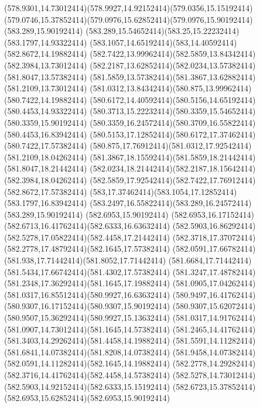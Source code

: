 {{	\curveto(578.9301,14.73012414)(578.9927,14.92152414)(579.0356,15.15192414)
	\curveto(579.0746,15.37852414)(579.0976,15.62852414)(579.0976,15.90192414)
	\closepath
	\moveto(583.289,15.90192414)
	\curveto(583.289,15.54652414)(583.25,15.22232414)(583.1797,14.93322414)
	\curveto(583.1057,14.65192414)(583,14.40592414)(582.8672,14.19882414)
	\curveto(582.7422,13.99962414)(582.5859,13.84342414)(582.3984,13.73012414)
	\curveto(582.2187,13.62852414)(582.0234,13.57382414)(581.8047,13.57382414)
	\curveto(581.5859,13.57382414)(581.3867,13.62882414)(581.2109,13.73012414)
	\curveto(581.0312,13.84342414)(580.875,13.99962414)(580.7422,14.19882414)
	\curveto(580.6172,14.40592414)(580.5156,14.65192414)(580.4453,14.93322414)
	\curveto(580.3713,15.22232414)(580.3359,15.54652414)(580.3359,15.90192414)
	\curveto(580.3359,16.24572414)(580.3709,16.55822414)(580.4453,16.83942414)
	\curveto(580.5153,17.12852414)(580.6172,17.37462414)(580.7422,17.57382414)
	\curveto(580.875,17.76912414)(581.0312,17.92542414)(581.2109,18.04262414)
	\curveto(581.3867,18.15592414)(581.5859,18.21442414)(581.8047,18.21442414)
	\curveto(582.0234,18.21442414)(582.2187,18.15642414)(582.3984,18.04262414)
	\curveto(582.5859,17.92542414)(582.7422,17.76912414)(582.8672,17.57382414)
	\curveto(583,17.37462414)(583.1054,17.12852414)(583.1797,16.83942414)
	\curveto(583.2497,16.55822414)(583.289,16.24572414)(583.289,15.90192414)
	\closepath
	\moveto(582.6953,15.90192414)
	\curveto(582.6953,16.17152414)(582.6713,16.41762414)(582.6333,16.63632414)
	\curveto(582.5903,16.86292414)(582.5278,17.05822414)(582.4458,17.21442414)
	\curveto(582.3718,17.37072414)(582.2778,17.48792414)(582.1645,17.57382414)
	\curveto(582.0591,17.66782414)(581.938,17.71442414)(581.8052,17.71442414)
	\curveto(581.6684,17.71442414)(581.5434,17.66742414)(581.4302,17.57382414)
	\curveto(581.3247,17.48782414)(581.2348,17.36292414)(581.1645,17.19882414)
	\curveto(581.0905,17.04262414)(581.0317,16.85512414)(580.9927,16.63632414)
	\curveto(580.9497,16.41762414)(580.9307,16.17152414)(580.9307,15.90192414)
	\curveto(580.9307,15.62072414)(580.9507,15.36292414)(580.9927,15.13632414)
	\curveto(581.0317,14.91762414)(581.0907,14.73012414)(581.1645,14.57382414)
	\curveto(581.2465,14.41762414)(581.3403,14.29262414)(581.4458,14.19882414)
	\curveto(581.5591,14.11282414)(581.6841,14.07382414)(581.8208,14.07382414)
	\curveto(581.9458,14.07382414)(582.0591,14.11282414)(582.1645,14.19882414)
	\curveto(582.2778,14.29282414)(582.3716,14.41762414)(582.4458,14.57382414)
	\curveto(582.5278,14.73012414)(582.5903,14.92152414)(582.6333,15.15192414)
	\curveto(582.6723,15.37852414)(582.6953,15.62852414)(582.6953,15.90192414)
}}
